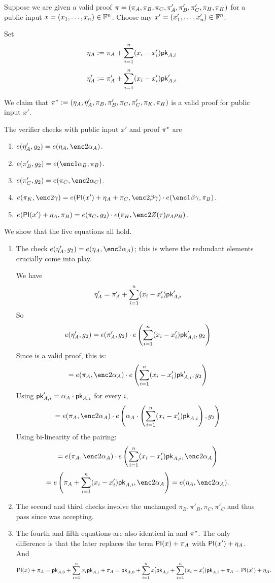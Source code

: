 \documentclass[11pt]{article}
\numberwithin{equation}{section} %
\numberwithin{figure}{section} %
\newcommand{\eps}{\epsilon}
\newcommand{\e}{\eps}
\begin{document}
 
 Suppose we are given a valid proof $\pi = (\pi_A,\pi_B,\pi_C,\pi'_A,\pi'_B,\pi'_C,\pi_H,\pi_K)$
 for a public input $x=(x_1,\ldots,x_n)\in \mathbb F^{n}$.
 Choose any $x'=(x'_1,\ldots,x'_n)\in \mathbb F^n$.

 Set 
 \[\eta_A:= \pi_A + \sum_{i=1}^n (x_i-x'_i)\mathsf{pk}_{A,i}\]
 \[\eta'_A:= \pi'_A + \sum_{i=1}^n (x_i-x'_i) \mathsf{pk}'_{A,i}\]
 
 We claim that $\pi^* := (\eta_A,\eta'_A,\pi_B,\pi'_B,\pi_C,\pi'_C,\pi_K,\pi_H)$ is a valid proof for
 public input $x'$.
 
 The verifier checks with public input $x'$ and proof $\pi^*$ are
\begin{enumerate}
 \item $e(\eta'_A,g_2)=e(\eta_A,\enc2{\alpha_A})$.
\item $e(\pi'_B, g_2)=e(\enc1{\alpha_B},\pi_B)$.
\item $e(\pi'_C,g_2)=e(\pi_C,\enc2{\alpha_C})$.
\item $e(\pi_K,\enc2{\gamma})=e(\PI(x')+\eta_A+\pi_C,\enc2{\beta\gamma})\cdot e(\enc1{\beta\gamma},\pi_B)$.
\item $e(\PI(x')+\eta_A,\pi_B)= e(\pi_C,g_2)\cdot e(\pi_H,\enc2{Z(\tau)\rho_A\rho_B})$.
 \end{enumerate}
 
 
 We show that the five equations all hold.
 \begin{enumerate}
  \item The check  $e(\eta'_A,g_2)=e(\eta_A,\enc2{\alpha_A})$;
  this is where the redundant elements crucially come into play.
  
  
  We have
  \[\eta'_A = \pi'_A + \sum_{i=1}^n (x_i-x'_i) \mathsf{pk}'_{A,i}\]
 So
 \[e(\eta'_A,g_2) = \e(\pi'_A,g_2)\cdot e\left(\sum_{i=1}^n (x_i-x'_i) \pk'_{A,i},g_2\right)\]
 Since \prf is a valid proof, this is:
  \[=e(\pi_A,\enc2{\alpha_A})\cdot e\left(\sum_{i=1}^n (x_i-x'_i) \pk'_{A,i},g_2\right)\]
  Using $\mathsf{pk}'_{A,i} = \alpha_A\cdot \mathsf{pk}_{A,i}$ for every $i$,
  \[=e(\pi_A,\enc2{\alpha_A})\cdot e\left(\alpha_A\cdot \left(\sum_{i=1}^n (x_i-x'_i) \pk_{A,i}\right),g_2\right)\]
Using bi-linearity of the pairing:
 \[=e(\pi_A,\enc2{\alpha_A})\cdot e\left(\sum_{i=1}^n (x_i-x'_i) \pk_{A,i},\enc2{\alpha_A}\right)\]
  \[=e\left(\pi_A+\sum_{i=1}^n (x_i-x'_i) \pk_{A,i},\enc2{\alpha_A}\right) = e(\eta_A,\enc2{\alpha_A}).\]
  \item The second and third checks involve the unchanged $\pi_B,\pi'_B,\pi_C,\pi'_C$
  and thus pass since \prf was accepting.
  \item The fourth and fifth equations are also identical in \prf and $\pi^*$.
  The only difference is that the later replaces the term $\mathsf{PI}(x) + \pi_A$ 
  with $\mathsf{PI}(x')+ \eta_A$. And 
    \[\mathsf{PI}(x) + \pi_A = \mathsf{pk}_{A,0} + \sum_{i=1}^n x_i\mathsf{pk}_{A,i} + \pi_A = 
  \mathsf{pk}_{A,0} + \sum_{i=1}^n x'_i\mathsf{pk}_{A,i} +  \sum_{i=1}^n (x_i-x'_i) \mathsf{pk}_{A,i}  + \pi_A =
  \mathsf{PI}(x') + \eta_A.
  \]

 \end{enumerate}
 
\end{document}

